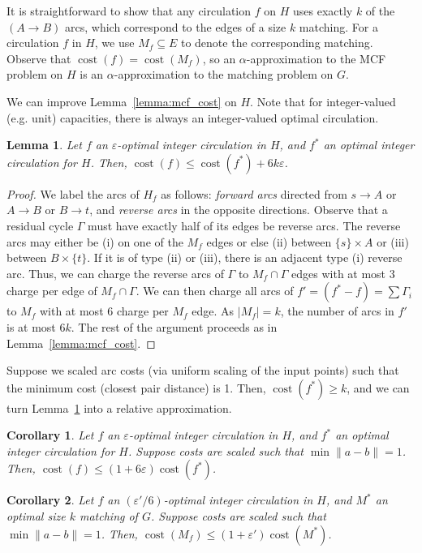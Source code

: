 \documentclass[11pt]{article}
\def\eps{\varepsilon}
\theoremstyle{plain}
\newtheorem{lemma}{Lemma}
\newtheorem{corollary}{Corollary}
\def\cost{\operatorname{cost}}
\begin{document}
It is straightforward to show that any circulation $f$ on $H$ uses exactly 
$k$ of the $(A \to B)$ arcs, which correspond to the edges of a size $k$ 
matching.
For a circulation $f$ in $H$, we use $M_f \subseteq E$ to denote the 
corresponding matching.
Observe that $\cost(f) = \cost(M_f)$, so an $\alpha$-approximation to the MCF 
problem on $H$ is an $\alpha$-approximation to the matching problem on $G$.

We can improve Lemma~\ref{lemma:mcf_cost} on $H$.
Note that for integer-valued (e.g. unit) capacities, there is always an
integer-valued optimal circulation.
\begin{lemma}
\label{lemma:goldberg_cost_add}
	Let $f$ an $\eps$-optimal integer circulation in $H$, and $f^*$ an 
	optimal integer circulation for $H$.
	Then, $\cost(f) \leq \cost(f^*) + 6k\eps$.
\end{lemma}
\begin{proof}
	We label the arcs of $H_f$ as follows: \emph{forward arcs} directed
	from $s \to A$ or $A \to B$ or $B \to t$, and \emph{reverse arcs} in
	the opposite directions.
	Observe that a residual cycle $\Gamma$ must have exactly half of its 
	edges be reverse arcs.
	The reverse arcs may either be (i) on one of the $M_f$ edges or else
	(ii) between $\{s\} \times A$ or (iii) between $B \times \{t\}$.
	If it is of type (ii) or (iii), there is an adjacent type (i) reverse
	arc.
	Thus, we can charge the reverse arcs of $\Gamma$ to $M_f \cap \Gamma$ 
	edges with at most 3 charge per edge of $M_f \cap \Gamma$.
	We can then charge all arcs of $f' = (f^* - f) = \sum \Gamma_i$ to 
	$M_f$ with at most 6 charge per $M_f$ edge.
	As $|M_f| = k$, the number of arcs in $f'$ is at most $6k$.
	The rest of the argument proceeds as in Lemma~\ref{lemma:mcf_cost}.
\end{proof}

Suppose we scaled arc costs (via uniform scaling of the input points) such that
the minimum cost (closest pair distance) is 1.
Then, $\cost(f^*) \geq k$, and we can turn Lemma~\ref{lemma:goldberg_cost_add}
into a relative approximation.

\begin{corollary}
\label{corollary:flow_approx}
	Let $f$ an $\eps$-optimal integer circulation in $H$, and $f^*$ an 
	optimal integer circulation for $H$.
	Suppose costs are scaled such that $\min \|a - b\| = 1$.
	Then, $\cost(f) \leq (1 + 6\eps) \cost(f^*)$.
\end{corollary}

\begin{corollary}
\label{corollary:match_approx}
	Let $f$ an $(\eps'/6)$-optimal integer circulation in $H$, and $M^*$ an 
	optimal size $k$ matching of $G$.
	Suppose costs are scaled such that $\min \|a - b\| = 1$.
	Then, $\cost(M_f) \leq (1 + \eps') \cost(M^*)$.
\end{corollary}
\end{document}
